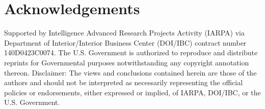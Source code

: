 \section*{Acknowledgements}

Supported by Intelligence Advanced Research Projects Activity (IARPA) via Department of Interior/Interior Business Center (DOI/IBC) contract number 140D0423C0074. The U.S. Government is authorized to reproduce and distribute reprints for Governmental purposes notwithstanding any copyright annotation thereon. Disclaimer: The views and conclusions contained herein are those of the authors and should not be interpreted as necessarily representing the official policies or endorsements, either expressed or implied, of IARPA, DOI/IBC, or the U.S. Government.